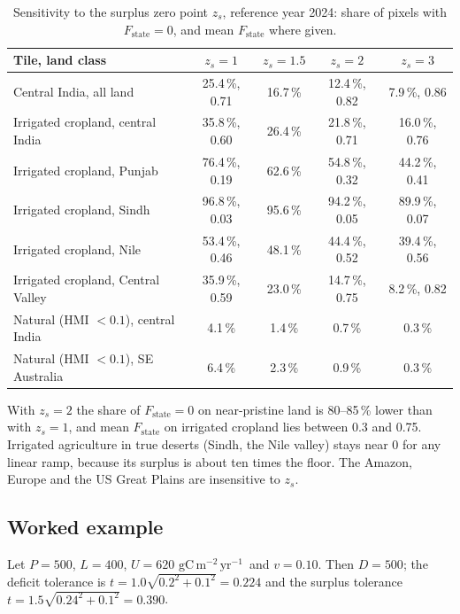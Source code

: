 \documentclass[11pt,a4paper]{article}
\newcommand{\npp}{\ensuremath{\mathrm{gC\,m^{-2}\,yr^{-1}}}}
\begin{document}
\begin{table}[H]
\centering\small
\caption{Sensitivity to the surplus zero point $z_s$, reference year 2024: share of pixels with
$F_{\text{state}} = 0$, and mean $F_{\text{state}}$ where given.}
\label{tab:zs}
\begin{tabular}{lcccc}
\toprule
Tile, land class & $z_s = 1$ & $z_s = 1.5$ & $z_s = 2$ & $z_s = 3$ \\
\midrule
Central India, all land & 25.4\,\%, 0.71 & 16.7\,\% & 12.4\,\%, 0.82 & 7.9\,\%, 0.86 \\
Irrigated cropland, central India & 35.8\,\%, 0.60 & 26.4\,\% & 21.8\,\%, 0.71 & 16.0\,\%, 0.76 \\
Irrigated cropland, Punjab & 76.4\,\%, 0.19 & 62.6\,\% & 54.8\,\%, 0.32 & 44.2\,\%, 0.41 \\
Irrigated cropland, Sindh & 96.8\,\%, 0.03 & 95.6\,\% & 94.2\,\%, 0.05 & 89.9\,\%, 0.07 \\
Irrigated cropland, Nile & 53.4\,\%, 0.46 & 48.1\,\% & 44.4\,\%, 0.52 & 39.4\,\%, 0.56 \\
Irrigated cropland, Central Valley & 35.9\,\%, 0.59 & 23.0\,\% & 14.7\,\%, 0.75 & 8.2\,\%, 0.82 \\
Natural (HMI $< 0.1$), central India & 4.1\,\% & 1.4\,\% & 0.7\,\% & 0.3\,\% \\
Natural (HMI $< 0.1$), SE Australia & 6.4\,\% & 2.3\,\% & 0.9\,\% & 0.3\,\% \\
\bottomrule
\end{tabular}
\end{table}

With $z_s = 2$ the share of $F_{\text{state}} = 0$ on near-pristine land is 80--85\,\% lower than
with $z_s = 1$, and mean $F_{\text{state}}$ on irrigated cropland lies between 0.3 and 0.75.
Irrigated agriculture in true deserts
(Sindh, the Nile valley) stays near 0 for any linear ramp, because its surplus is about ten times
the floor. The Amazon, Europe and the US Great Plains are insensitive to $z_s$.

\subsection{Worked example}

Let $P = 500$, $L = 400$, $U = 620$ \npp\ and $v = 0.10$. Then $D = 500$; the deficit tolerance is
$t = 1.0\sqrt{0.2^2 + 0.1^2} = 0.224$ and the surplus tolerance
$t = 1.5\sqrt{0.24^2 + 0.1^2} = 0.390$.
\end{document}
